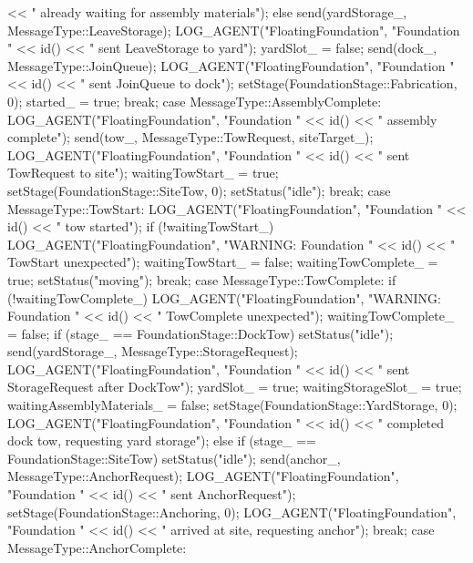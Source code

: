 \documentclass[10pt,letterpaper]{jsarticle}
\begin{document}
\begin{cppcode}
{{{{{                              << " already waiting for assembly materials");
                }
            } else {
                send(yardStorage_, MessageType::LeaveStorage);
                LOG_AGENT("FloatingFoundation", "Foundation " << id() << " sent LeaveStorage to yard");
                yardSlot_ = false;
                send(dock_, MessageType::JoinQueue);
                LOG_AGENT("FloatingFoundation", "Foundation " << id() << " sent JoinQueue to dock");
                setStage(FoundationStage::Fabrication, 0);
                started_ = true;
            }
        }
        break;
    case MessageType::AssemblyComplete:
        LOG_AGENT("FloatingFoundation", "Foundation " << id() << " assembly complete");
        send(tow_, MessageType::TowRequest, siteTarget_);
        LOG_AGENT("FloatingFoundation", "Foundation " << id() << " sent TowRequest to site");
        waitingTowStart_ = true;
        setStage(FoundationStage::SiteTow, 0);
        setStatus("idle");
        break;
    case MessageType::TowStart:
        LOG_AGENT("FloatingFoundation", "Foundation " << id() << " tow started");
        if (!waitingTowStart_) {
            LOG_AGENT("FloatingFoundation", "WARNING: Foundation " << id() << " TowStart unexpected");
        }
        waitingTowStart_ = false;
        waitingTowComplete_ = true;
        setStatus("moving");
        break;
    case MessageType::TowComplete:
        if (!waitingTowComplete_) {
            LOG_AGENT("FloatingFoundation", "WARNING: Foundation " << id() << " TowComplete unexpected");
        }
        waitingTowComplete_ = false;
        if (stage_ == FoundationStage::DockTow) {
            setStatus("idle");
            send(yardStorage_, MessageType::StorageRequest);
            LOG_AGENT("FloatingFoundation", "Foundation " << id() << " sent StorageRequest after DockTow");
            yardSlot_ = true;
            waitingStorageSlot_ = true;
            waitingAssemblyMaterials_ = false;
            setStage(FoundationStage::YardStorage, 0);
            LOG_AGENT("FloatingFoundation", "Foundation " << id() << " completed dock tow, requesting yard storage");
        } else if (stage_ == FoundationStage::SiteTow) {
            setStatus("idle");
            send(anchor_, MessageType::AnchorRequest);
            LOG_AGENT("FloatingFoundation", "Foundation " << id() << " sent AnchorRequest");
            setStage(FoundationStage::Anchoring, 0);
            LOG_AGENT("FloatingFoundation", "Foundation " << id() << " arrived at site, requesting anchor");
        }
        break;
    case MessageType::AnchorComplete:
}}
\end{cppcode}
\end{document}
